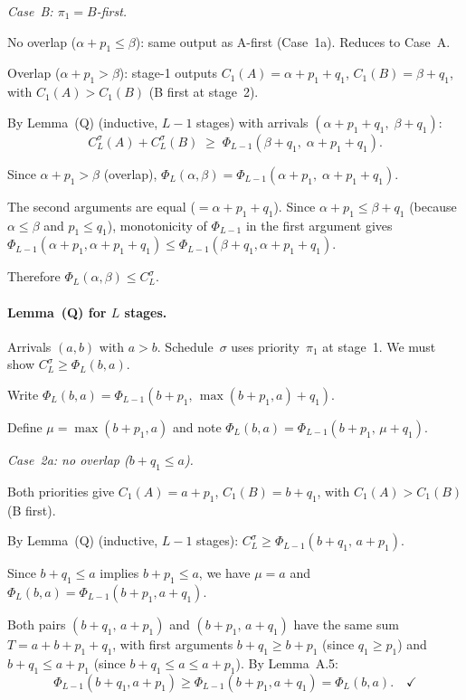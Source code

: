 \documentclass[11pt,titlepage]{article}
\begin{document}
\emph{Case~B: $\pi_1 = B$-first.}

No overlap ($\alpha + p_1 \leq \beta$): same output
as A-first (Case~1a). Reduces to Case~A. \checkmark

Overlap ($\alpha + p_1 > \beta$): stage-1 outputs
$C_1(A) = \alpha + p_1 + q_1$,
$C_1(B) = \beta + q_1$, with $C_1(A) > C_1(B)$ (B first
at stage~2).

By Lemma~(Q) (inductive, $L-1$ stages)
with arrivals $(\alpha + p_1 + q_1,\; \beta + q_1)$:
\[
  C_L^\sigma(A) + C_L^\sigma(B)
  \;\geq\;
  \Phi_{L-1}(\beta + q_1,\; \alpha + p_1 + q_1).
\]

Since $\alpha + p_1 > \beta$ (overlap),
$\Phi_L(\alpha,\beta)
= \Phi_{L-1}(\alpha + p_1,\; \alpha + p_1 + q_1)$.

The second arguments are equal ($= \alpha + p_1 + q_1$).
Since $\alpha + p_1 \leq \beta + q_1$ (because
$\alpha \leq \beta$ and $p_1 \leq q_1$), monotonicity of
$\Phi_{L-1}$ in the first argument gives
$\Phi_{L-1}(\alpha + p_1, \alpha + p_1 + q_1) \leq
\Phi_{L-1}(\beta + q_1, \alpha + p_1 + q_1)$.

Therefore $\Phi_L(\alpha,\beta) \leq C_L^\sigma$.
\checkmark

\paragraph{Lemma~(Q) for $L$ stages.}

Arrivals $(a, b)$ with $a > b$. Schedule~$\sigma$ uses
priority~$\pi_1$ at stage~1. We must show
$C_L^\sigma \geq \Phi_L(b, a)$.

Write $\Phi_L(b, a) = \Phi_{L-1}(b + p_1,\,
\max(b + p_1, a) + q_1)$.

Define $\mu = \max(b + p_1, a)$ and note
$\Phi_L(b,a) = \Phi_{L-1}(b + p_1,\, \mu + q_1)$.

\emph{Case~2a: no overlap ($b + q_1 \leq a$).}

Both priorities give $C_1(A) = a + p_1$,
$C_1(B) = b + q_1$, with $C_1(A) > C_1(B)$ (B first).

By Lemma~(Q) (inductive, $L-1$ stages):
$C_L^\sigma \geq \Phi_{L-1}(b + q_1,\, a + p_1)$.

Since $b + q_1 \leq a$ implies $b + p_1 \leq a$, we have
$\mu = a$ and $\Phi_L(b,a) = \Phi_{L-1}(b + p_1, a + q_1)$.

Both pairs $(b + q_1,\, a + p_1)$ and
$(b + p_1,\, a + q_1)$ have the same sum
$T = a + b + p_1 + q_1$, with first arguments
$b + q_1 \geq b + p_1$ (since $q_1 \geq p_1$) and
$b + q_1 \leq a + p_1$ (since $b + q_1 \leq a
\leq a + p_1$). By Lemma~A.5:
\[
  \Phi_{L-1}(b + q_1, a + p_1) \geq
  \Phi_{L-1}(b + p_1, a + q_1) = \Phi_L(b,a).
  \quad\checkmark
\]
\end{document}
